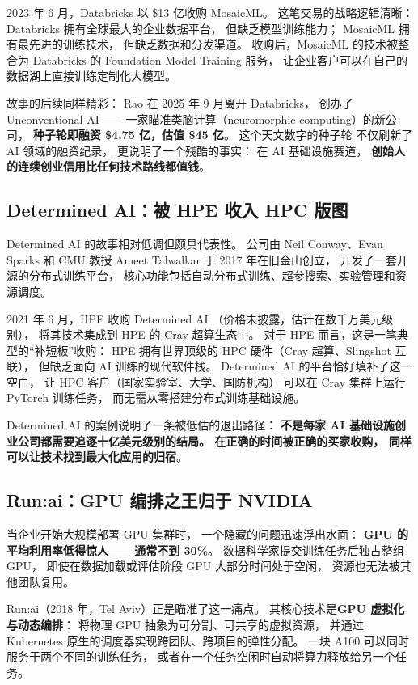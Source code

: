 2023 年 6 月，Databricks 以 \$13 亿收购 MosaicML。
这笔交易的战略逻辑清晰：
Databricks 拥有全球最大的企业数据平台，
但缺乏模型训练能力；
MosaicML 拥有最先进的训练技术，
但缺乏数据和分发渠道。
收购后，MosaicML 的技术被整合为 Databricks 的 Foundation Model Training 服务，
让企业客户可以在自己的数据湖上直接训练定制化大模型。

故事的后续同样精彩：
Rao 在 2025 年 9 月离开 Databricks，
创办了 Unconventional AI——
一家瞄准类脑计算（neuromorphic computing）的新公司，
\textbf{种子轮即融资 \$4.75 亿，估值 \$45 亿}。
这个天文数字的种子轮
不仅刷新了 AI 领域的融资纪录，
更说明了一个残酷的事实：
在 AI 基础设施赛道，
\textbf{创始人的连续创业信用比任何技术路线都值钱}。


\subsection{Determined AI：被 HPE 收入 HPC 版图}

Determined AI 的故事相对低调但颇具代表性。
公司由 Neil Conway、Evan Sparks 和 CMU 教授 Ameet Talwalkar
于 2017 年在旧金山创立，
开发了一套开源的分布式训练平台，
核心功能包括自动分布式训练、超参搜索、实验管理和资源调度。

2021 年 6 月，HPE 收购 Determined AI
（价格未披露，估计在数千万美元级别），
将其技术集成到 HPE 的 Cray 超算生态中。
对于 HPE 而言，这是一笔典型的``补短板''收购：
HPE 拥有世界顶级的 HPC 硬件（Cray 超算、Slingshot 互联），
但缺乏面向 AI 训练的现代软件栈。
Determined AI 的平台恰好填补了这一空白，
让 HPC 客户（国家实验室、大学、国防机构）
可以在 Cray 集群上运行 PyTorch 训练任务，
而无需从零搭建分布式训练基础设施。

Determined AI 的案例说明了一条被低估的退出路径：
\textbf{不是每家 AI 基础设施创业公司都需要追逐十亿美元级别的结局。
在正确的时间被正确的买家收购，
同样可以让技术找到最大化应用的归宿}。


\subsection{Run:ai：GPU 编排之王归于 NVIDIA}

当企业开始大规模部署 GPU 集群时，
一个隐藏的问题迅速浮出水面：
\textbf{GPU 的平均利用率低得惊人——通常不到 30\%}。
数据科学家提交训练任务后独占整组 GPU，
即使在数据加载或评估阶段 GPU 大部分时间处于空闲，
资源也无法被其他团队复用。

Run:ai（2018 年，Tel Aviv）正是瞄准了这一痛点。
其核心技术是\textbf{GPU 虚拟化与动态编排}：
将物理 GPU 抽象为可分割、可共享的虚拟资源，
并通过 Kubernetes 原生的调度器实现跨团队、跨项目的弹性分配。
一块 A100 可以同时服务于两个不同的训练任务，
或者在一个任务空闲时自动将算力释放给另一个任务。

